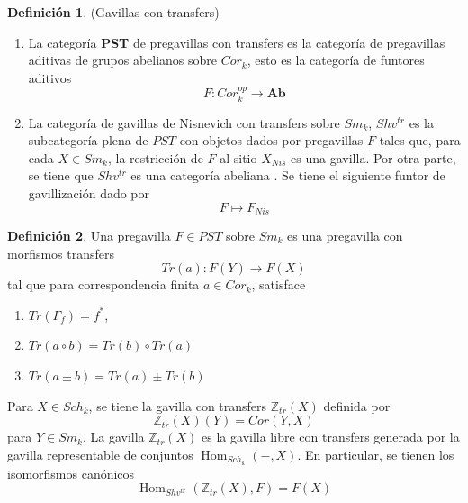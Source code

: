 \documentclass[10pt]{amsart}
\theoremstyle{definition}
\newtheorem{definition}{Definici\'on}[section]
\theoremstyle{remark}
\theoremstyle{definition}
\newcommand{\Hom}{\operatorname{Hom}}
\begin{document}
\begin{definition} (Gavillas con transfers) 

\begin{enumerate}
\item La categoría \textbf{PST} de pregavillas con transfers es la categoría de pregavillas aditivas de grupos abelianos sobre 
$Cor_{k}$, esto es la categoría de funtores aditivos
\begin{equation*}
F:Cor^{op}_{k} \rightarrow \textbf{Ab}
\end{equation*}
\item La categoría de gavillas de Nisnevich con transfers sobre $Sm_{\mathit{k}}$, $Shv^{tr}$ es la subcategoría plena de $PST$ con objetos dados por pregavillas $F$ tales que, para cada $X \in Sm_{\mathit{k}}$, la restricción de $F$ al sitio $X_{Nis}$ es una gavilla. Por otra parte, se tiene que  $Shv^{tr}$  es una categoría abeliana \cite[13.1]{MVW06}.  Se tiene el siguiente funtor de gavillización dado por
\begin{equation*}
F \mapsto F_{Nis}
\end{equation*}
\end{enumerate}
\end{definition}

\begin{definition} Una pregavilla $F \in PST$ sobre $Sm_{\mathit{k}}$ es una pregavilla con morfismos transfers
\begin{equation*}
Tr(a):F(Y) \rightarrow F(X)
\end{equation*}
tal que para correspondencia finita $a \in Cor_{\mathit{k}}$, satisface
\begin{enumerate}
\item $Tr(\Gamma_{f})=f^{*}$,
\item $Tr(a \circ b)=Tr(b) \circ Tr(a)$
\item $Tr(a \pm b)=Tr(a)\pm Tr(b)$
\end{enumerate}
\end{definition}

Para $X \in Sch_{\mathit{k}}$, se tiene la gavilla con transfers $\mathbb{Z}_{tr}(X)$ definida por
\begin{equation*}
\mathbb{Z}_{tr}(X)(Y)=Cor(Y,X)
\end{equation*}
para $Y \in Sm_{\mathit{k}}$. La gavilla $\mathbb{Z}_{tr}(X)$ es la gavilla libre con transfers generada por la gavilla representable de conjuntos $\Hom_{Sch_\mathit{k}}(-,X)$. En particular, se tienen los isomorfismos canónicos
\begin{equation*}
\operatorname{Hom}_{Shv^{tr}}(\mathbb{Z}_{tr}(X),F)=F(X)
\end{equation*}
\end{document}
